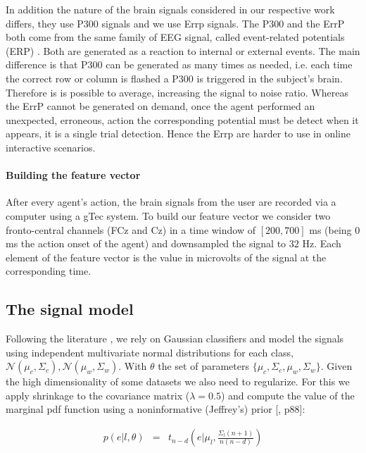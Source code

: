 In addition the nature of the brain signals considered in our respective work differs, they use P300 signals and we use Errp signals. The P300 and the ErrP both come from the same family of EEG signal, called event-related potentials (ERP) \cite{chavarriaga2014errare}. Both are generated as a reaction to internal or external events. The main difference is that P300 can be generated as many times as needed, i.e. each time the correct row or column is flashed a P300 is triggered in the subject's brain. Therefore is is possible to average, increasing the signal to noise ratio. Whereas the ErrP cannot be generated on demand, once the agent performed an unexpected, erroneous, action the corresponding potential must be detect when it appears, it is a single trial detection. Hence the Errp are harder to use in online interactive scenarios.

\paragraph{Building the feature vector} After every agent's action, the brain signals from the user are recorded via a computer using a gTec system. To build our feature vector we consider two fronto-central channels (FCz and Cz) in a time window of $[200,700]$ ms (being 0 ms the action onset of the agent) and downsampled the signal to $32$ Hz. Each element of the feature vector is the value in microvolts of the signal at the corresponding time. 

\subsection{The signal model}

Following the literature \cite{lotte2007review,blankertz2010single}, we rely on Gaussian classifiers and model the signals using independent multivariate normal distributions for each class, $\mathcal{N}(\mu_c, \Sigma_c), \mathcal{N}(\mu_w, \Sigma_w)$. With $\theta$ the set of parameters $\{\mu_c, \Sigma_c,\mu_w, \Sigma_w\}$. Given the high dimensionality of some datasets we also need to regularize. For this we apply shrinkage to the covariance matrix ($\lambda = 0.5$) and compute the value of the marginal pdf function using a noninformative (Jeffrey's) prior [\cite{gelman2003bayesian}, p88]:

\begin{eqnarray}
p(e|l, \theta) & = & t_{n-d}(e | \mu_l,\frac{\Sigma_l (n+1)}{n(n-d)})
\label{eq:prior}
\end{eqnarray}

